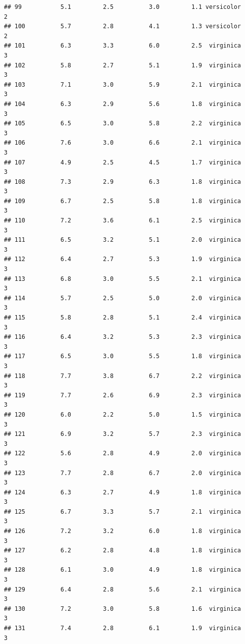 \documentclass[
]{book}
\begin{document}
\begin{verbatim}
## 99           5.1         2.5          3.0         1.1 versicolor          2
## 100          5.7         2.8          4.1         1.3 versicolor          2
## 101          6.3         3.3          6.0         2.5  virginica          3
## 102          5.8         2.7          5.1         1.9  virginica          3
## 103          7.1         3.0          5.9         2.1  virginica          3
## 104          6.3         2.9          5.6         1.8  virginica          3
## 105          6.5         3.0          5.8         2.2  virginica          3
## 106          7.6         3.0          6.6         2.1  virginica          3
## 107          4.9         2.5          4.5         1.7  virginica          3
## 108          7.3         2.9          6.3         1.8  virginica          3
## 109          6.7         2.5          5.8         1.8  virginica          3
## 110          7.2         3.6          6.1         2.5  virginica          3
## 111          6.5         3.2          5.1         2.0  virginica          3
## 112          6.4         2.7          5.3         1.9  virginica          3
## 113          6.8         3.0          5.5         2.1  virginica          3
## 114          5.7         2.5          5.0         2.0  virginica          3
## 115          5.8         2.8          5.1         2.4  virginica          3
## 116          6.4         3.2          5.3         2.3  virginica          3
## 117          6.5         3.0          5.5         1.8  virginica          3
## 118          7.7         3.8          6.7         2.2  virginica          3
## 119          7.7         2.6          6.9         2.3  virginica          3
## 120          6.0         2.2          5.0         1.5  virginica          3
## 121          6.9         3.2          5.7         2.3  virginica          3
## 122          5.6         2.8          4.9         2.0  virginica          3
## 123          7.7         2.8          6.7         2.0  virginica          3
## 124          6.3         2.7          4.9         1.8  virginica          3
## 125          6.7         3.3          5.7         2.1  virginica          3
## 126          7.2         3.2          6.0         1.8  virginica          3
## 127          6.2         2.8          4.8         1.8  virginica          3
## 128          6.1         3.0          4.9         1.8  virginica          3
## 129          6.4         2.8          5.6         2.1  virginica          3
## 130          7.2         3.0          5.8         1.6  virginica          3
## 131          7.4         2.8          6.1         1.9  virginica          3

\end{verbatim}
\end{document}
